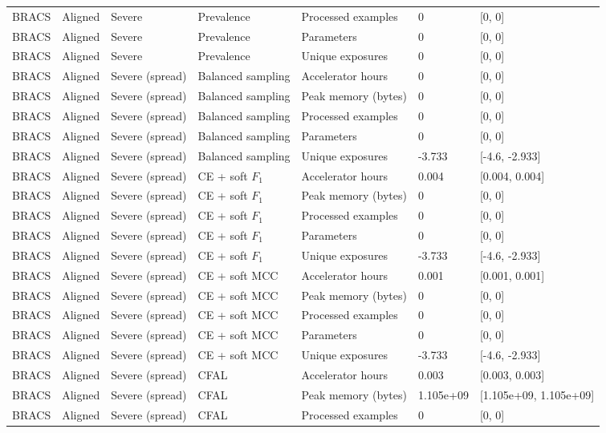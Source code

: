 \begin{longtable}{lllllll}
BRACS & Aligned & Severe & Prevalence & Processed examples & 0 & [0, 0] \\
BRACS & Aligned & Severe & Prevalence & Parameters & 0 & [0, 0] \\
BRACS & Aligned & Severe & Prevalence & Unique exposures & 0 & [0, 0] \\
BRACS & Aligned & Severe (spread) & Balanced sampling & Accelerator hours & 0 & [0, 0] \\
BRACS & Aligned & Severe (spread) & Balanced sampling & Peak memory (bytes) & 0 & [0, 0] \\
BRACS & Aligned & Severe (spread) & Balanced sampling & Processed examples & 0 & [0, 0] \\
BRACS & Aligned & Severe (spread) & Balanced sampling & Parameters & 0 & [0, 0] \\
BRACS & Aligned & Severe (spread) & Balanced sampling & Unique exposures & -3.733 & [-4.6, -2.933] \\
BRACS & Aligned & Severe (spread) & CE + soft $F_1$ & Accelerator hours & 0.004 & [0.004, 0.004] \\
BRACS & Aligned & Severe (spread) & CE + soft $F_1$ & Peak memory (bytes) & 0 & [0, 0] \\
BRACS & Aligned & Severe (spread) & CE + soft $F_1$ & Processed examples & 0 & [0, 0] \\
BRACS & Aligned & Severe (spread) & CE + soft $F_1$ & Parameters & 0 & [0, 0] \\
BRACS & Aligned & Severe (spread) & CE + soft $F_1$ & Unique exposures & -3.733 & [-4.6, -2.933] \\
BRACS & Aligned & Severe (spread) & CE + soft MCC & Accelerator hours & 0.001 & [0.001, 0.001] \\
BRACS & Aligned & Severe (spread) & CE + soft MCC & Peak memory (bytes) & 0 & [0, 0] \\
BRACS & Aligned & Severe (spread) & CE + soft MCC & Processed examples & 0 & [0, 0] \\
BRACS & Aligned & Severe (spread) & CE + soft MCC & Parameters & 0 & [0, 0] \\
BRACS & Aligned & Severe (spread) & CE + soft MCC & Unique exposures & -3.733 & [-4.6, -2.933] \\
BRACS & Aligned & Severe (spread) & CFAL & Accelerator hours & 0.003 & [0.003, 0.003] \\
BRACS & Aligned & Severe (spread) & CFAL & Peak memory (bytes) & 1.105e+09 & [1.105e+09, 1.105e+09] \\
BRACS & Aligned & Severe (spread) & CFAL & Processed examples & 0 & [0, 0] \\

\end{longtable}
